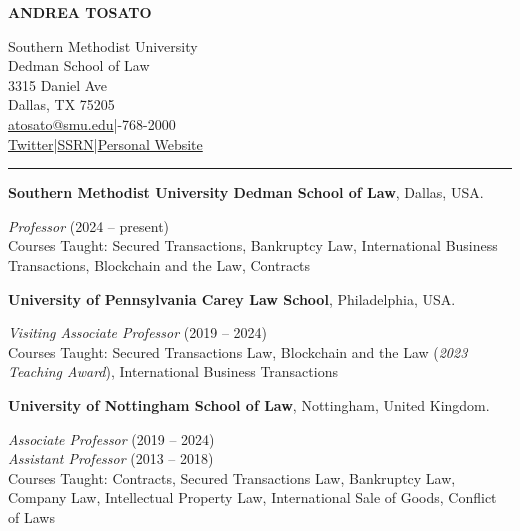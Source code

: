 \documentclass[
  11pt,
  letterpaper]{article}
\author{}
\date{}
\begin{document}
\begin{center}
{\fontsize{16}{19}\selectfont \textbf{ANDREA TOSATO}}

\vspace{0.2em}
Southern Methodist University\\
Dedman School of Law\\
3315 Daniel Ave\\
Dallas, TX 75205\\
\href{mailto:atosato@smu.edu}{atosato@smu.edu}\enspace|-768-2000\\
\href{https://x.com/Andrea_Tosato}{Twitter}\enspace|\enspace\href{https://papers.ssrn.com/sol3/cf_dev/AbsByAuth.cfm?per_id=1851659}{SSRN}\enspace|\enspace\href{https://www.andreatosato.com}{Personal Website}
\end{center}

\vspace{0.25em}\hrule\vspace{0.7em}

\noindent\textbf{Southern Methodist University Dedman School of Law},
Dallas, USA.

\bgroup \par\leftskip=0.5in\parskip=0pt\parindent=0pt
\textit{Professor} (2024 -- present)\\
Courses Taught: Secured Transactions, Bankruptcy Law, International Business Transactions, Blockchain and the Law, Contracts
\par\leftskip=0pt\egroup

\vspace{0.8em}\noindent\textbf{University of Pennsylvania Carey Law School},
Philadelphia, USA.

\bgroup \par\leftskip=0.5in\parskip=0pt\parindent=0pt
\textit{Visiting Associate Professor} (2019 -- 2024)\\
Courses Taught: Secured Transactions Law, Blockchain and the Law (\textit{2023 Teaching Award}), International Business Transactions
\par\leftskip=0pt\egroup

\vspace{0.8em}\noindent\textbf{University of Nottingham School of Law},
Nottingham, United Kingdom.

\bgroup \par\leftskip=0.5in\parskip=0pt\parindent=0pt
\textit{Associate Professor} (2019 -- 2024)\\
\textit{Assistant Professor} (2013 -- 2018)\\
Courses Taught: Contracts, Secured Transactions Law, Bankruptcy Law, Company Law, Intellectual Property Law, International Sale of Goods, Conflict of Laws
\par\leftskip=0pt\egroup
\end{document}
